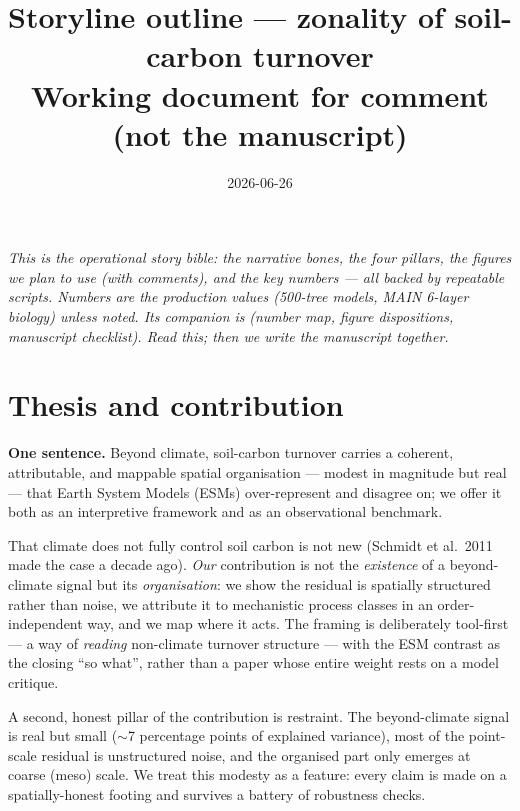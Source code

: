 \documentclass[11pt]{article}
\title{\vspace{-1.2cm}\textbf{Storyline outline --- zonality of soil-carbon turnover}\\[2pt]
\large Working document for comment (not the manuscript)}
\author{}
\date{2026-06-26}
\DeclareRobustCommand{\fpath}[1]{{\small\texttt{\detokenize{#1}}}}
\begin{document}
\maketitle
\vspace{-0.8cm}

\noindent\textit{This is the operational story bible: the narrative bones, the four
pillars, the figures we plan to use (with comments), and the key numbers --- all
backed by repeatable scripts. Numbers are the production values (500-tree models,
MAIN 6-layer biology) unless noted. Its companion is}
\fpath{results_reconciliation_2026-06-26.md} \textit{(number map, figure
dispositions, manuscript checklist). Read this; then we write the manuscript
together.}

\section{Thesis and contribution}

\textbf{One sentence.} Beyond climate, soil-carbon turnover carries a coherent,
attributable, and mappable spatial organisation --- modest in magnitude but real
--- that Earth System Models (ESMs) over-represent and disagree on; we offer it
both as an interpretive framework and as an observational benchmark.

That climate does not fully control soil carbon is not new (Schmidt et al.\ 2011
made the case a decade ago). \emph{Our} contribution is not the \emph{existence}
of a beyond-climate signal but its \emph{organisation}: we show the residual is
spatially structured rather than noise, we attribute it to mechanistic process
classes in an order-independent way, and we map where it acts. The framing is
deliberately tool-first --- a way of \emph{reading} non-climate turnover
structure --- with the ESM contrast as the closing ``so what'', rather than a
paper whose entire weight rests on a model critique.

A second, honest pillar of the contribution is restraint. The beyond-climate
signal is real but small ($\sim$7 percentage points of explained variance), most
of the point-scale residual is unstructured noise, and the organised part only
emerges at coarse (meso) scale. We treat this modesty as a feature: every claim
is made on a spatially-honest footing and survives a battery of robustness checks.

\end{document}
